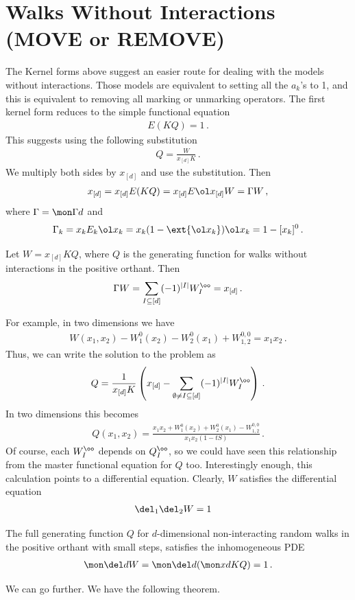 \section{Walks Without Interactions (MOVE or REMOVE)}
The Kernel forms above suggest an easier route for dealing with the models without interactions. Those models are equivalent to setting all the $a_k$'s to 1, and this is equivalent to removing all marking or unmarking operators. The first kernel form reduces to the simple functional equation
\begin{align}
	 E(KQ) = 1\,.
\end{align}
This suggests using the following substitution
\begin{align}
	Q = \frac{W}{x_{[d]} K}\,.
\end{align}
We multiply both sides by $x_{[d]}$ and use the substitution. Then
\begin{align}
	x_{[d]} = x_{[d]}E(KQ) = x_{[d]}E\ol x_{[d]}W = \Gamma W\,,
\end{align}
where  $\Gamma = \mon \Gamma d$ and 
\begin{align}
	\Gamma_k = x_kE_k\ol x_k = x_k(1-\ext{\ol x_k})\ol x_k = 1 - [x_k]^0\,.
\end{align}
\begin{prop} Let $W = x_{[d]}KQ$, where $Q$ is the generating function for walks without interactions in the positive orthant. Then
\begin{align}
	\Gamma W = \sum_{I\subseteq [d]}(-1)^{|I|} W_I^\oo= x_{[d]}\,.
\end{align}
\end{prop}
For example, in two dimensions we have
\begin{align}
	W(x_1,x_2) - W_1^0(x_2) -W_2^0(x_1) + W_{1,2}^{0,0} = x_1x_2\,.
\end{align}
Thus, we can write the solution to the problem as
\begin{align}
	Q = \frac{1}{x_{[d]}K}\left(x_{[d]}-\sum_{\emptyset \neq I\subseteq [d]}(-1)^{|I|} W_I^\oo\right)\,.
\end{align}
In two dimensions this becomes
\begin{align}
	Q(x_1,x_2) = \frac{x_1x_2+W_1^0(x_2)+W_2^0(x_1)-W_{1,2}^{0,0}}{x_1x_2(1-tS)}\,.
\end{align}
Of course, each $W_I^\oo$ depends on $Q_I^\oo$, so we could have seen this relationship from the master functional equation for $Q$ too.
Interestingly enough, this calculation points to a differential equation. Clearly, $W$ satisfies the differential equation
\begin{align}
	\del_1\del_2 W &= 1
\end{align}
\begin{prop} The full generating function $Q$ for $d$-dimensional non-interacting random walks in the positive orthant with small steps, satisfies the inhomogeneous PDE
\begin{align}
	\mon \del d W = \mon \del d (\mon xd KQ) = 1\,.
\end{align}
\end{prop}
We can go further. We have the following theorem.

